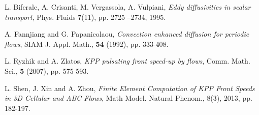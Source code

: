 \documentclass{article}
\newcommand{\0}{\mathbf{0}}
\newcommand{\1}{\mathbf{1}}
\newcommand{\2}{\mathbf{2}}
\newcommand{\3}{\mathbf{3}}
\newcommand{\4}{\mathbf{4}}
\newcommand{\5}{\mathbf{5}}
\newcommand{\6}{\mathbf{6}}
\newcommand{\7}{\mathbf{7}}
\newcommand{\8}{\mathbf{8}}
\begin{document}
\begin{thebibliography}{99}

L. Biferale, A. Crisanti, M. Vergassola, A. Vulpiani,
{\em Eddy diffusivities in scalar transport}, Phys. Fluids 7(11), pp. 2725 --2734, 1995.

 A. Fannjiang and G. Papanicolaou,
{\em Convection enhanced diffusion for periodic flows}, SIAM J.
Appl. Math., {\bf 54} (1992), pp. 333-408.

L. Ryzhik and A. Zlatos,
{\em KPP pulsating front speed-up by flows}, Comm. Math. Sci., {\bf
5} (2007), pp. 575-593.

L. Shen, J. Xin and A. Zhou, {\em Finite Element Computation of KPP
Front Speeds in 3D Cellular and ABC Flows}, Math Model. Natural Phenom., 8(3), 2013, pp. 182-197. 




\end{thebibliography}
\end{document}
